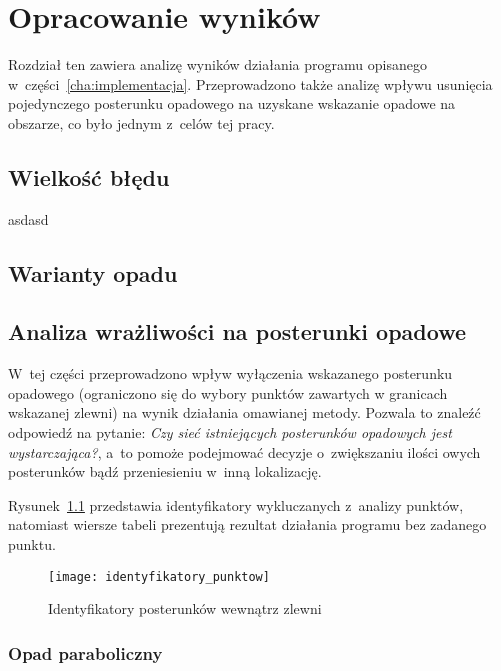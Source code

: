\chapter{Opracowanie wyników}

Rozdział ten zawiera analizę wyników działania programu opisanego w~części~\ref{cha:implementacja}. Przeprowadzono także analizę wpływu usunięcia pojedynczego posterunku opadowego na uzyskane wskazanie opadowe na obszarze, co było jednym z~celów tej pracy.


\section{Wielkość błędu}
asdasd

\section{Warianty opadu}

\section{Analiza wrażliwości na posterunki opadowe}
W~tej części przeprowadzono wpływ wyłączenia wskazanego posterunku opadowego (ograniczono się do wybory punktów zawartych w granicach wskazanej zlewni) na wynik działania omawianej metody. Pozwala to znaleźć odpowiedź na pytanie: \textit{Czy sieć istniejących posterunków opadowych jest wystarczająca?}, a~to pomoże podejmować decyzje o~zwiększaniu ilości owych posterunków bądź przeniesieniu w~inną lokalizację.

Rysunek~\ref{fig:identyfikatory} przedstawia identyfikatory wykluczanych z~analizy punktów, natomiast wiersze tabeli prezentują rezultat działania programu bez zadanego punktu.

\begin{figure}[!ht]
	\centering
	\texttt{[image: identyfikatory\_punktow]}
	\label{fig:identyfikatory}
	\caption{Identyfikatory posterunków wewnątrz zlewni}
\end{figure}

\subsection{Opad paraboliczny}

